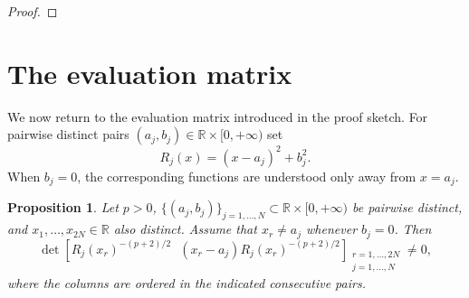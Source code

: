 \documentclass[leqno,11pt]{amsart}
\numberwithin{equation}{section}
\newcommand{\bbR}{\mathbb{R}}
\newtheorem{proposition}{Proposition}
\theoremstyle{definition}
\begin{document}
\begin{proof}
		
%		
	\end{proof}
	
	\section{The evaluation matrix}\label{sec:evaluation}
	
	We now return to the evaluation matrix introduced in the proof sketch. For pairwise distinct pairs $(a_j,b_j)\in\bbR\times[0,+\infty)$ set
	\begin{equation}\label{eq:Rj-evaluation}
		R_j(x)=(x-a_j)^2+b_j^2.
	\end{equation}
	When $b_j=0$, the corresponding functions are understood only away from $x=a_j$.
	
	\begin{proposition}\label{prop:evaluation}
		Let $p>0$, $\lbrace (a_j,b_j)\rbrace_{j=1,\ldots,N} \subset  \bbR \times [0,+\infty) $ be pairwise distinct, and $x_1,\ldots,x_{2N}\in\bbR$ also distinct. Assume that $x_r\neq a_j$ whenever $b_j=0$. Then
		\begin{equation}\label{eq:evaluation-det}
			\det\left[
			R_j(x_r)^{-(p+2)/2}\ \ \ (x_r-a_j)R_j(x_r)^{-(p+2)/2}
			\right]_{\substack{r=1,\ldots,2N\\ j=1,\ldots,N}}
			\neq0,
		\end{equation}
		where the columns are ordered in the indicated consecutive pairs.
	\end{proposition}
	
\end{document}
